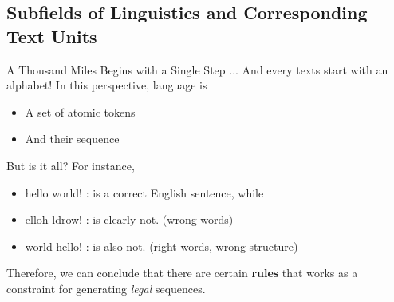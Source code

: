 \documentclass{beamer}
\begin{document}
\subsection{Subfields of Linguistics and Corresponding Text Units}

\begin{frame}{A Thousand Miles Begins with a Single Step}
... And every texts start with an alphabet! In this perspective, language is
\begin{itemize}
\item A set of atomic tokens
\item And their sequence
\end{itemize}

But is it all? For instance,

\begin{itemize}
\item hello world! : is a correct English sentence, while
\item elloh ldrow! : is clearly not. (wrong words)
\item world hello! : is also not. (right words, wrong structure)
\end{itemize}

Therefore, we can conclude that there are certain \textbf{rules} that works as a constraint for generating \textit{legal} sequences.
\end{frame}
\end{document}

